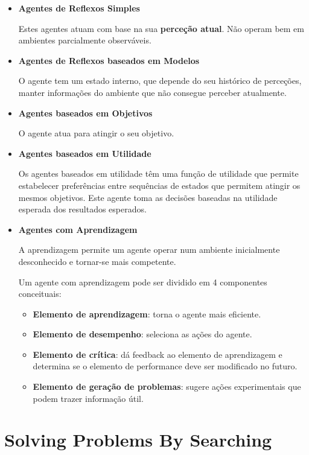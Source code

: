 \documentclass[11pt]{article}
\begin{document}
\begin{itemize}
    \item \textbf{Agentes de Reflexos Simples}
    
    Estes agentes atuam com base na sua \textbf{perceção atual}. Não operam bem em ambientes parcialmente observáveis.

    \item \textbf{Agentes de Reflexos baseados em Modelos}
    
    O agente tem um estado interno, que depende do seu histórico de perceções, manter informações do ambiente que não consegue perceber atualmente.

    \item \textbf{Agentes baseados em Objetivos}
    
    O agente atua para atingir o seu objetivo.

    \item \textbf{Agentes baseados em Utilidade}
    
    Os agentes baseados em utilidade têm uma função de utilidade que permite estabelecer preferências entre sequências de estados que permitem atingir os mesmos objetivos. Este agente toma as decisões baseadas na utilidade esperada dos resultados esperados.

    \item \textbf{Agentes com Aprendizagem}
    
    A aprendizagem permite um agente operar num ambiente inicialmente desconhecido e tornar-se mais competente. 

    Um agente com aprendizagem pode ser dividido em 4 componentes conceituais:
    \begin{itemize}[topsep=0pt, itemsep=0pt]
        \item \textbf{Elemento de aprendizagem}: torna o agente mais eficiente.
        \item \textbf{Elemento de desempenho}: seleciona as ações do agente.
        \item \textbf{Elemento de crítica}: dá feedback ao elemento de aprendizagem  e determina se o elemento de performance deve ser modificado no futuro.
        \item \textbf{Elemento de geração de problemas}: sugere ações experimentais que podem trazer informação útil.
    \end{itemize}
\end{itemize}

\newpage
\section{Solving Problems By Searching}
\end{document}
